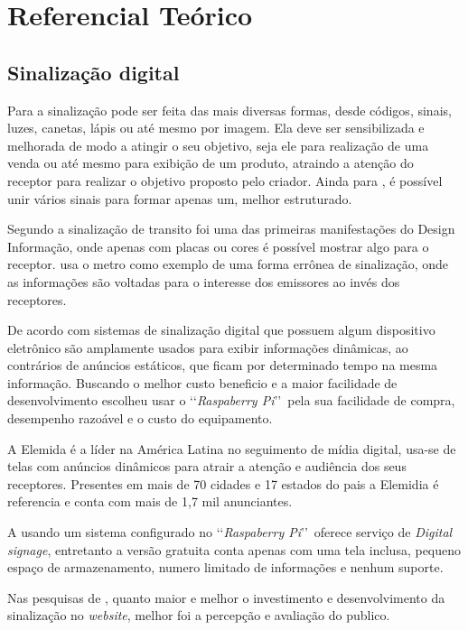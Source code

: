 
\chapter[Referencial Teórico]{Referencial Teórico}

\section{Sinalização digital}
Para \cite{munari2006} a sinalização pode ser feita das mais diversas formas, desde códigos, sinais, luzes, canetas, lápis ou até mesmo por imagem. Ela deve ser sensibilizada e melhorada de modo a  atingir o seu objetivo, seja ele para realização de uma venda ou até mesmo para exibição de um produto, atraindo a atenção do receptor para realizar o objetivo proposto pelo criador. Ainda para \cite{munari2006}, é possível unir vários sinais para formar apenas um, melhor estruturado.

Segundo \cite{redig2004} a sinalização de transito foi uma das primeiras manifestações do Design Informação, onde apenas com placas ou cores é possível mostrar algo para o receptor. \cite{redig2004} usa o metro como exemplo de uma forma errônea de sinalização, onde as informações são voltadas para o interesse dos emissores ao invés dos receptores. 

De acordo com \cite{mishima2016} sistemas de sinalização digital que possuem algum dispositivo eletrônico são amplamente usados para exibir informações dinâmicas, ao contrários de anúncios estáticos, que ficam por determinado tempo na mesma informação. Buscando o melhor custo beneficio e a maior facilidade de desenvolvimento \cite{mishima2016} escolheu usar o \lq\lq \textit{Raspaberry Pi}\rq\rq\ pela sua facilidade de compra, desempenho razoável e o custo do equipamento.

A Elemida é a líder na América Latina no seguimento de mídia digital, usa-se de telas com anúncios dinâmicos para atrair a atenção e audiência dos seus receptores. Presentes em mais de 70 cidades e 17 estados do pais a Elemidia é referencia e conta com mais de 1,7 mil anunciantes. \cite{elemidia2017}

A \cite{screenly2017} usando um sistema configurado no \lq\lq\textit{Raspaberry Pi}\rq\rq\ oferece serviço de \textit{Digital signage}, entretanto a versão gratuita conta apenas com uma tela inclusa, pequeno espaço de armazenamento, numero limitado de informações e nenhum suporte.

Nas pesquisas de \cite{brambilla2017}, quanto maior e melhor o investimento e desenvolvimento da sinalização no \textit{website}, melhor foi a percepção e avaliação do publico.